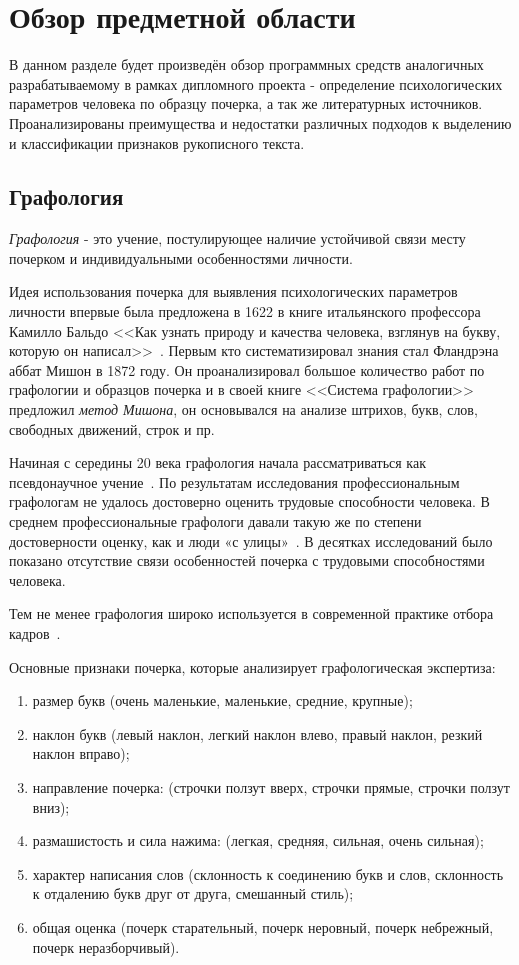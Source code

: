 \section{Обзор предметной области}
\label{sec:domain:intro}

В данном разделе будет произведён обзор программных средств аналогичных разрабатываемому в рамках дипломного проекта - определение психологических параметров человека по образцу почерка, а так же литературных источников. Проанализированы преимущества и недостатки различных подходов к выделению и классификации признаков рукописного текста.

\subsection{Графология}
\label{sub:domain:grafologic}
\emph{Графология} - это учение, постулирующее наличие устойчивой связи месту почерком и индивидуальными особенностями личности.

Идея использования почерка для выявления психологических параметров личности впервые была предложена в 1622 в книге итальянского профессора Камилло Бальдо <<Как узнать природу и качества человека, взглянув на букву, которую он написал>>~\cite{kamillo_grafology}. Первым кто систематизировал знания стал Фландрэна аббат Мишон в 1872 году. Он проанализировал большое количество работ по графологии и образцов почерка и в своей книге <<Система графологии>> предложил \emph{метод Мишона}, он основывался на анализе штрихов, букв, слов, свободных движений, строк и пр.~\cite{mishon_grafology}

Начиная с середины 20 века графология начала рассматриваться как псевдонаучное учение~\cite{graphology_wiki}. По результатам исследования профессиональным графологам не удалось достоверно оценить трудовые способности человека. В среднем профессиональные графологи давали такую же по степени достоверности оценку, как и люди «с улицы»~\cite{neter_shakhar_psevdograph, king_koehler_psevdograph}. В десятках исследований было показано отсутствие связи особенностей почерка с трудовыми способностями человека.

Тем не менее графология широко используется в современной практике отбора кадров~\cite{graphology_psyfactor}.

Основные признаки почерка, которые анализирует графологическая экспертиза:
\begin{enumerate}
  \item размер букв (очень маленькие, маленькие, средние, крупные);
  \item наклон букв (левый наклон, легкий наклон влево, правый наклон, резкий наклон вправо);
  \item направление почерка: (строчки ползут вверх, строчки прямые,  строчки ползут вниз);
  \item размашистость и сила нажима: (легкая, средняя, сильная, очень сильная);
  \item характер написания слов (склонность к соединению букв и слов, склонность к отдалению букв друг от друга, смешанный стиль);
  \item общая оценка (почерк старательный, почерк неровный, почерк небрежный, почерк неразборчивый).
\end{enumerate}

